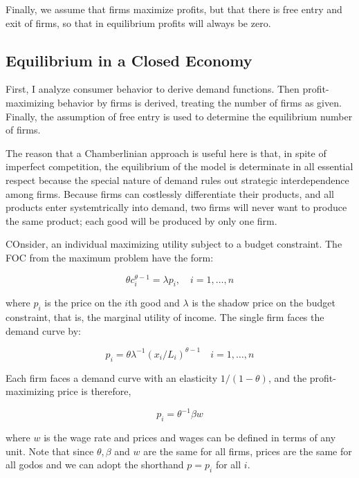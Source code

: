 Finally, we assume that firms maximize profits, but that there is free entry and exit of firms, so that in equilibrium profits will always be zero.

\subsection{Equilibrium in a Closed Economy}

First, I analyze consumer behavior to derive demand functions. Then profit-maximizing behavior by firms is derived, treating the number of firms as given. Finally, the assumption of free entry is used to determine the equilibrium number of firms.

The reason that a Chamberlinian approach is useful here is that, in spite of imperfect competition, the equilibrium of the model is determinate in all essential respect because the special nature of demand rules out strategic interdependence among firms. Because firms can costlessly differentiate their products, and all products enter systemtrically into demand, two firms will never want to produce the same product; each good will be produced by only one firm.

COnsider, an individual maximizing utility subject to a budget constraint. The FOC from the maximum problem have the form:

\begin{equation}
    \theta c_i^{\theta - 1} = \lambda p_i, \quad i = 1, \ldots, n
\end{equation}

where $p_i$ is the price on the $i$th good and $\lambda$ is the shadow price on the budget constraint, that is, the marginal utility of income. The single firm faces the demand curve by:

\begin{equation}
    p_i = \theta \lambda^{-1} (x_i / L_i)^{\theta - 1} \quad i = 1, \ldots, n
\end{equation}

Each firm faces a demand curve with an elasticity $1 / (1 - \theta)$, and the profit-maximizing price is therefore,

\begin{equation}
    p_i = \theta^{-1} \beta w
\end{equation}

where $w$ is the wage rate and prices and wages can be defined in terms of any unit. Note that since $\theta, \beta$ and $w$ are the same for all firms, prices are the same for all godos and we can adopt the shorthand $p = p_i$ for all $i$.

